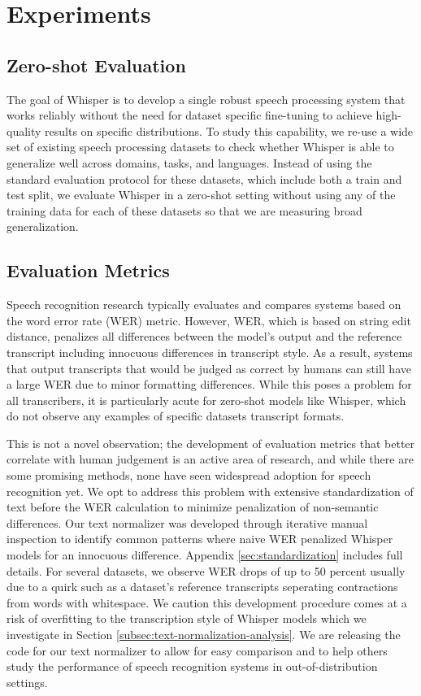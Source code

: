 \section{Experiments}\label{sec:experiments}

\subsection{Zero-shot Evaluation}\label{subsec:zeroshot}

The goal of Whisper is to develop a single robust speech processing system that works reliably without the need for dataset specific fine-tuning to achieve high-quality results on specific distributions. To study this capability, we re-use a wide set of existing speech processing datasets to check whether Whisper is able to generalize well across domains, tasks, and languages. Instead of using the standard evaluation protocol for these datasets, which include both a train and test split, we evaluate Whisper in a zero-shot setting without using any of the training data for each of these datasets so that we are measuring broad generalization.

\subsection{Evaluation Metrics}\label{subsec:eval-metric}

Speech recognition research typically evaluates and compares systems based on the word error rate (WER) metric. However, WER, which is based on string edit distance, penalizes all differences between the model's output and the reference transcript including innocuous differences in transcript style. As a result, systems that output transcripts that would be judged as correct by humans can still have a large WER due to minor formatting differences. While this poses a problem for all transcribers, it is particularly acute for zero-shot models like Whisper, which do not observe any examples of specific datasets transcript formats.

This is not a novel observation; the development of evaluation metrics that better correlate with human judgement is an active area of research, and while there are some promising methods, none have seen widespread adoption for speech recognition yet. We opt to address this problem with extensive standardization of text before the WER calculation to minimize penalization of non-semantic differences. Our text normalizer was developed through iterative manual inspection to identify common patterns where naive WER penalized Whisper models for an innocuous difference. Appendix \ref{sec:standardization} includes full details. For several datasets, we observe WER drops of up to 50 percent usually due to a quirk such as a dataset's reference transcripts seperating contractions from words with whitespace. We caution this development procedure comes at a risk of overfitting to the transcription style of Whisper models which we investigate in Section \ref{subsec:text-normalization-analysis}. We are releasing the code for our text normalizer to allow for easy comparison and to help others study the performance of speech recognition systems in out-of-distribution settings.

